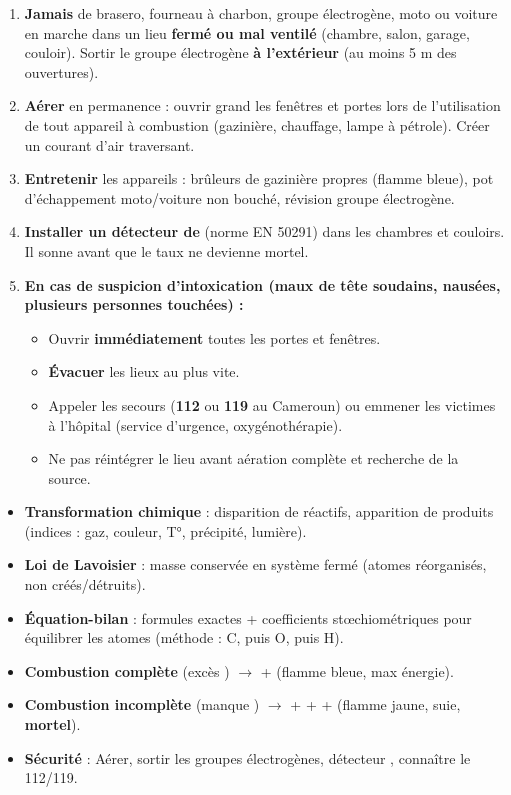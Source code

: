 \documentclass[11pt]{article}
\begin{document}
\begin{methode}
\begin{enumerate}
\item \textbf{Jamais} de brasero, fourneau à charbon, groupe électrogène, moto ou voiture en marche dans un lieu \textbf{fermé ou mal ventilé} (chambre, salon, garage, couloir). Sortir le groupe électrogène \textbf{à l'extérieur} (au moins 5 m des ouvertures).
\item \textbf{Aérer} en permanence : ouvrir grand les fenêtres et portes lors de l'utilisation de tout appareil à combustion (gazinière, chauffage, lampe à pétrole). Créer un courant d'air traversant.
\item \textbf{Entretenir} les appareils : brûleurs de gazinière propres (flamme bleue), pot d'échappement moto/voiture non bouché, révision groupe électrogène.
\item \textbf{Installer un détecteur de } (norme EN 50291) dans les chambres et couloirs. Il sonne avant que le taux ne devienne mortel.
\item \textbf{En cas de suspicion d'intoxication (maux de tête soudains, nausées, plusieurs personnes touchées) :}
\begin{itemize}
\item Ouvrir \textbf{immédiatement} toutes les portes et fenêtres.
\item \textbf{Évacuer} les lieux au plus vite.
\item Appeler les secours (\textbf{112} ou \textbf{119} au Cameroun) ou emmener les victimes à l'hôpital (service d'urgence, oxygénothérapie).
\item Ne pas réintégrer le lieu avant aération complète et recherche de la source.
\end{itemize}
\end{enumerate}
\end{methode}

\begin{aretenir}
\begin{itemize}
\item \textbf{Transformation chimique} : disparition de réactifs, apparition de produits (indices : gaz, couleur, T°, précipité, lumière).
\item \textbf{Loi de Lavoisier} : masse conservée en système fermé (atomes réorganisés, non créés/détruits).
\item \textbf{Équation-bilan} : formules exactes + coefficients stœchiométriques pour équilibrer les atomes (méthode : C, puis O, puis H).
\item \textbf{Combustion complète} (excès ) $\to$  +  (flamme bleue, max énergie).
\item \textbf{Combustion incomplète} (manque ) $\to$  +  +  +  (flamme jaune, suie, \textbf{ mortel}).
\item \textbf{Sécurité} : Aérer, sortir les groupes électrogènes, détecteur , connaître le 112/119.
\end{itemize}
\end{aretenir}
\end{document}

